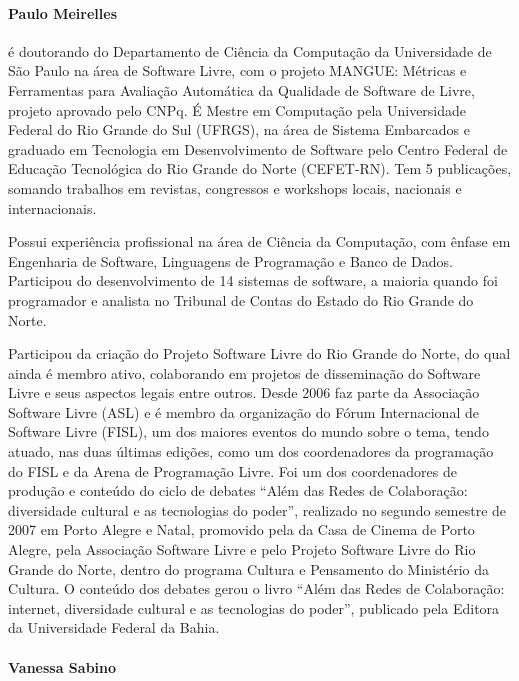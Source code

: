 \paragraph{Paulo Meirelles}

é doutorando do Departamento de Ciência da Computação da Universidade
de São Paulo na área de Software Livre, com o projeto MANGUE: Métricas
e Ferramentas para Avaliação Automática da Qualidade de Software de
Livre, projeto aprovado pelo CNPq.
%
É Mestre em Computação pela Universidade Federal do Rio Grande do Sul
(UFRGS), na área de Sistema Embarcados e graduado em Tecnologia em
Desenvolvimento de Software pelo Centro Federal de Educação
Tecnológica do Rio Grande do Norte (CEFET-RN).
%
Tem 5 publicações, somando trabalhos em revistas, congressos e
workshops locais, nacionais e internacionais.

Possui experiência profissional na área de Ciência da Computação, com
ênfase em Engenharia de Software, Linguagens de Programação e Banco de
Dados.
%
Participou do desenvolvimento de 14 sistemas de software, a maioria
quando foi programador e analista no Tribunal de Contas do Estado do
Rio Grande do Norte.

Participou da criação do Projeto Software Livre do Rio Grande do
Norte, do qual ainda é membro ativo, colaborando em projetos de
disseminação do Software Livre e seus aspectos legais entre outros.
%
Desde 2006 faz parte da Associação Software Livre (ASL) e é membro da
organização do Fórum Internacional de Software Livre (FISL), um dos
maiores eventos do mundo sobre o tema, tendo atuado, nas duas últimas
edições, como um dos coordenadores da programação do FISL e da Arena
de Programação Livre.
%
Foi um dos coordenadores de produção e conteúdo do ciclo de debates
``Além das Redes de Colaboração: diversidade cultural e as tecnologias
do poder'', realizado no segundo semestre de 2007 em Porto Alegre e
Natal, promovido pela da Casa de Cinema de Porto Alegre, pela
Associação Software Livre e pelo Projeto Software Livre do Rio Grande
do Norte, dentro do programa Cultura e Pensamento do Ministério da
Cultura.
%
O conteúdo dos debates gerou o livro ``Além das Redes de Colaboração:
internet, diversidade cultural e as tecnologias do poder'', publicado
pela Editora da Universidade Federal da Bahia.


\paragraph{Vanessa Sabino}

